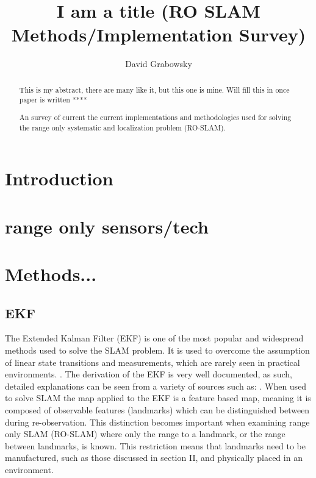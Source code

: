 \documentclass[conference]{IEEEtran}
\begin{document}
	\title{I am a title (RO SLAM Methods/Implementation Survey) }

	\author{David Grabowsky}
	
	
	
	
	\maketitle
	
	
\begin{abstract}

	
	This is my abstract, there are many like it, but this one is mine. Will fill this in once paper is written ****
	
	An survey of current the current implementations and methodologies used for solving the range only systematic and localization problem (RO-SLAM). 

\end{abstract}
	
	
	
\section{Introduction} 

\section{range only sensors/tech}
\section{Methods...}
\subsection{EKF}
The Extended Kalman Filter (EKF) is one of the most popular and widespread methods used to solve the SLAM problem. It is used to overcome the assumption of linear state transitions and measurements, which are rarely seen in practical environments. \cite{Thrun2002}. The derivation of the EKF is very well documented, as such, detailed explanations can be seen from a variety of sources such as: \cite{Thrun2002} \cite{Ribeiro2004} \cite{Haykin2001}. When used to solve SLAM the map applied to the EKF is a feature based map, meaning it is composed of observable features (landmarks) which can be distinguished between during re-observation.\cite{Thrun2002} This distinction becomes important when examining range only SLAM (RO-SLAM) where only the range to a landmark, or the range between landmarks, is known. This restriction means that landmarks need to be manufactured, such as those discussed in section II, and physically placed in an environment.
\end{document}
